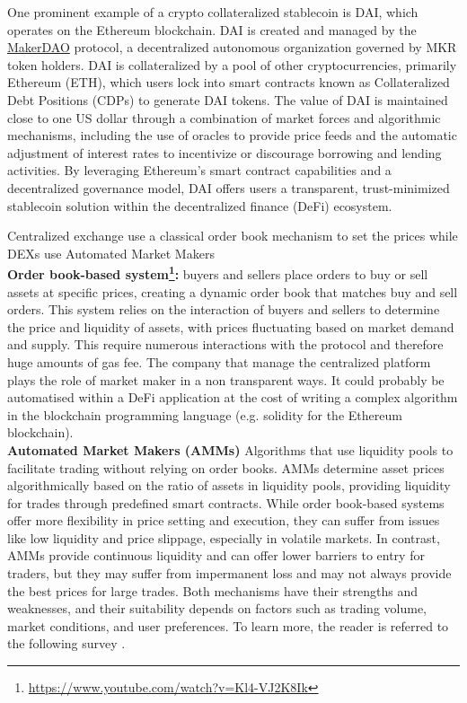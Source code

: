 \begin{ex}\label{ex:dai}
One prominent example of a crypto collateralized stablecoin is DAI, which operates on the Ethereum blockchain. DAI is created and managed by the \href{https://makerdao.com/en/}{MakerDAO} protocol, a decentralized autonomous organization governed by MKR token holders. DAI is collateralized by a pool of other cryptocurrencies, primarily Ethereum (ETH), which users lock into smart contracts known as Collateralized Debt Positions (CDPs) to generate DAI tokens. The value of DAI is maintained close to one US dollar through a combination of market forces and algorithmic mechanisms, including the use of oracles to provide price feeds and the automatic adjustment of interest rates to incentivize or discourage borrowing and lending activities. By leveraging Ethereum's smart contract capabilities and a decentralized governance model, DAI offers users a transparent, trust-minimized stablecoin solution within the decentralized finance (DeFi) ecosystem.
\end{ex}

\noindent Centralized exchange use a classical order book mechanism to set the prices while DEXs use Automated Market Makers\\

\noindent \textbf{Order book-based system\footnote{\url{https://www.youtube.com/watch?v=Kl4-VJ2K8Ik}}:} buyers and sellers place orders to buy or sell assets at specific prices, creating a dynamic order book that matches buy and sell orders. This system relies on the interaction of buyers and sellers to determine the price and liquidity of assets, with prices fluctuating based on market demand and supply. This require numerous interactions with the protocol and therefore huge amounts of gas fee. The company that manage the centralized platform plays the role of market maker in a non transparent ways. It could probably be automatised within a DeFi application at the cost of writing a complex algorithm in the blockchain programming language (e.g. solidity for the Ethereum blockchain).\\

\noindent \textbf{Automated Market Makers (AMMs)} Algorithms that use liquidity pools to facilitate trading without relying on order books. AMMs determine asset prices algorithmically based on the ratio of assets in liquidity pools, providing liquidity for trades through predefined smart contracts. While order book-based systems offer more flexibility in price setting and execution, they can suffer from issues like low liquidity and price slippage, especially in volatile markets. In contrast, AMMs provide continuous liquidity and can offer lower barriers to entry for traders, but they may suffer from impermanent loss and may not always provide the best prices for large trades. Both mechanisms have their strengths and weaknesses, and their suitability depends on factors such as trading volume, market conditions, and user preferences. To learn more, the reader is referred to the following survey \citet{Xu2023}.\\

